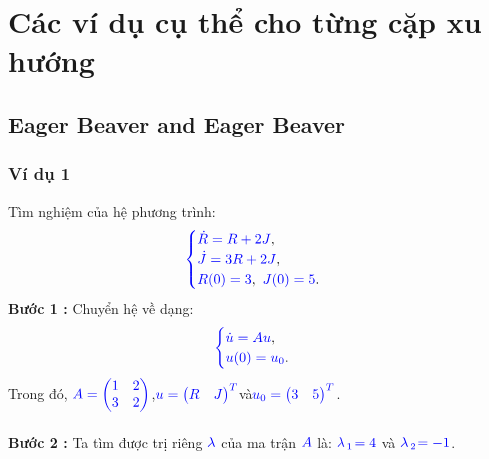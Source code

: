 \documentclass[a4paper]{article}
\begin{document}
\section{Các ví dụ cụ thể cho từng cặp xu hướng}
\subsection{Eager Beaver and Eager Beaver}
\subsubsection{Ví dụ 1}
Tìm nghiệm của hệ phương trình:
\begin{align}
	    \textcolor{blue}{
	    \begin{cases}
            \dot R = R + 2J \textcolor{black}{,}\\
            \dot J = 3R + 2J \textcolor{black}{,}\\
            R(0) = 3\textcolor{black}{,} \enskip J(0) = 5 \textcolor{black}{.}
        \end{cases}
        }
        \label{label6}
	\end{align}
{\bfseries Bước 1 :} Chuyển hệ về dạng:
\begin{align}
	    \textcolor{blue}{
	    \begin{cases}
            \dot u = Au \textcolor{black}{,}\\
            u(0) = u\sb{0}\textcolor{black}{.}
        \end{cases}
        }
        \label{label4}
	\end{align}
Trong đó,  $\textcolor{blue}{A = \begin{pmatrix} 1 & 2\\ 3 & 2 \end{pmatrix}}$,\enskip $\textcolor{blue}{u = \begin{pmatrix} R & J \end{pmatrix}\sp{T}}$\enskip và\enskip $\textcolor{blue}{u\sb{0} = \begin{pmatrix} 3 & 5 \end{pmatrix}\sp{T}}$.\\\\
{\bfseries Bước 2 :} Ta tìm được trị riêng $\textcolor{blue}{\lambda}$ của ma trận $\textcolor{blue}{A}$ là: $\textcolor{blue}{\lambda}$$\textcolor{blue}{\sb{1}}$$\textcolor{blue}{=4}$ và $\textcolor{blue}{\lambda}$$\textcolor{blue}{\sb{2}}$$\textcolor{blue}{=-1}$.\\\\
\end{document}
